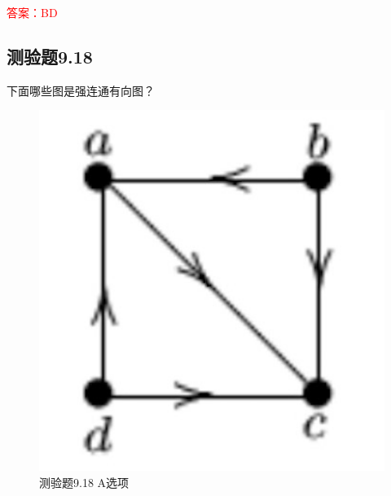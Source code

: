 \documentclass[UTF8, heading=true]{ctexart}
\begin{document}
\textcolor{red}{答案：BD}

\subsection{测验题9.18}

下面哪些图是强连通有向图？

\begin{figure}[H]
  \centering
  \begin{minipage}[t]{0.22\textwidth}
      \centering
      \includegraphics[width=1\textwidth]{9.17_1.jpg} %
      \vspace{-0.3cm}
      \caption{测验题9.18 A选项}
  \end{minipage}
  \hspace{0.18\textwidth} %
  \begin{minipage}[t]{0.2\textwidth}
      \centering

\end{minipage}
\end{figure}
\end{document}
